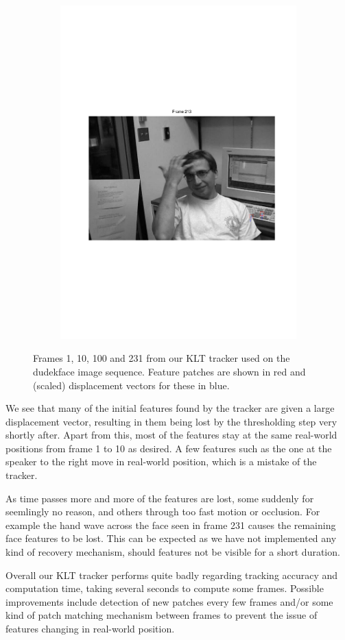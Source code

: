 \documentclass[11pt,a4paper]{article}
\begin{document}
\begin{figure}
\begin{subfigure}{0.45\textwidth}
\includegraphics[scale=0.4,trim={70 250 90 250}]{img/tracker_dudekface_213.pdf}
\end{subfigure}
\caption{Frames 1, 10, 100 and 231 from our KLT tracker used on the dudekface image sequence. Feature patches are shown in red and (scaled) displacement vectors for these in blue.}
\label{fig:tracker_dudekface}
\end{figure}

We see that many of the initial features found by the tracker are given a large displacement vector, resulting in them being lost by the thresholding step very shortly after. Apart from this, most of the features stay at the same real-world positions from frame 1 to 10 as desired. A few features such as the one at the speaker to the right move in real-world position, which is a mistake of the tracker.

As time passes more and more of the features are lost, some suddenly for seemlingly no reason, and others through too fast motion or occlusion. For example the hand wave across the face seen in frame 231 causes the remaining face features to be lost. This can be expected as we have not implemented any kind of recovery mechanism, should features not be visible for a short duration.

Overall our KLT tracker performs quite badly regarding tracking accuracy and computation time, taking several seconds to compute some frames. Possible improvements include detection of new patches every few frames and/or some kind of patch matching mechanism between frames to prevent the issue of features changing in real-world position.
%
\end{document}
